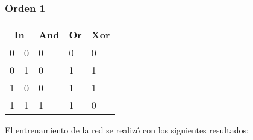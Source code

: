 \subsubsection{Orden 1}
\begin{table}[H]
    \centering
    \begin{tabular}{|ll|l|l|l|}
    \hline
    \multicolumn{2}{|c|}{\textbf{In}} & \multicolumn{1}{c|}{\textbf{And}} & \multicolumn{1}{c|}{\textbf{Or}} & \multicolumn{1}{c|}{\textbf{Xor}} \\ \hline
    \multicolumn{1}{|l|}{0}    & 0    & 0                                 & 0                                & 0                                 \\ \hline
    \multicolumn{1}{|l|}{0}    & 1    & 0                                 & 1                                & 1                                 \\ \hline
    \multicolumn{1}{|l|}{1}    & 0    & 0                                 & 1                                & 1                                 \\ \hline
    \multicolumn{1}{|l|}{1}    & 1    & 1                                 & 1                                & 0                                 \\ \hline
    \end{tabular}
\end{table}
El entrenamiento de la red se realizó con los siguientes resultados:
